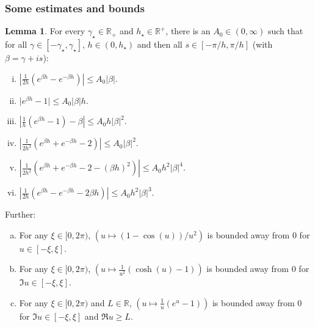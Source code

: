 \documentclass[pdftex,oneside,11pt,reqno]{amsart}
\theoremstyle{definition}
\theoremstyle{theorem}
\newtheorem{lemma}{Lemma}[section]
\theoremstyle{remark}
\numberwithin{equation}{section}
\numberwithin{definition}{section}
\begin{document}
\subsubsection{Some estimates and bounds}\label{subsection:some_technical_estimates_and_bounds}

\begin{lemma}\label{lemma:technical:estimates}
For every $\gamma_\star\in\mathbb{R}_+$ and $h_\star\in \mathbb{R}^+$, there is an $A_0\in (0,\infty)$ such that for all $\gamma\in [-\gamma_\star,\gamma_\star]$, $h\in (0,h_\star)$ and then all $s\in [-\pi/h,\pi/h]$ (with $\beta=\gamma+is$):
\begin{enumerate}[(i)]
\item\label{lemma:technical:estimates:i} $\left\vert\frac{1}{2h}(e^{\beta h}-e^{-\beta h})\right\vert\leq A_0\vert \beta\vert$. 
\item\label{lemma:technical:estimates:ii} $\vert e^{\beta h}-1\vert\leq A_0\vert \beta \vert h$.
\item\label{lemma:technical:estimates:iii} $\left\vert \frac{1}{h}(e^{\beta h}-1)-\beta\right\vert\leq A_0h \vert\beta \vert^2$.
\item\label{lemma:technical:estimates:iv} $\left\vert\frac{1}{2h^2}(e^{\beta h}+e^{-\beta h}-2)\right\vert\leq A_0\vert \beta\vert^2$. 
\item\label{lemma:technical:estimates:rough:I} $\left\vert\frac{1}{2h^2}(e^{\beta h}+e^{-\beta h}-2-(\beta h)^2)\right\vert\leq A_0 h^2\vert \beta\vert^4.$
\item \label{lemma:technical:estimates:rough:II} $\left\vert \frac{1}{2h}(e^{\beta h}-e^{-\beta h}-2\beta h)\right\vert\leq A_0 h^2\vert \beta\vert^3$.
\end{enumerate}

Further:
\begin{enumerate}[(a)]
\item \label{lemma:technical:coercivity:xx} For any $\xi \in [0,2\pi)$,
$\left(u\mapsto (1-\cos(u))/u^2\right)$ is bounded away from $0$ for $u\in [-\xi,\xi]$. 
\item \label{lemma:technical:coercivity:a} For any $\xi\in [0,2\pi)$,
$\left(u\mapsto \frac{1}{u^2}\left(\cosh(u)-1\right)\right)$ is bounded away from $0$ for $\Im u\in [-\xi,\xi]$. 
\item \label{lemma:technical:coercivity:b} For any $\xi\in [0,2\pi)$ and $L\in\mathbb{R}$,
$\left(u\mapsto \frac{1}{u}\left(e^u-1\right)\right)$ is bounded away from $0$ for $\Im u\in [-\xi,\xi]$ and $\Re u\geq L$. 
\end{enumerate}
\end{lemma}
\end{document}
